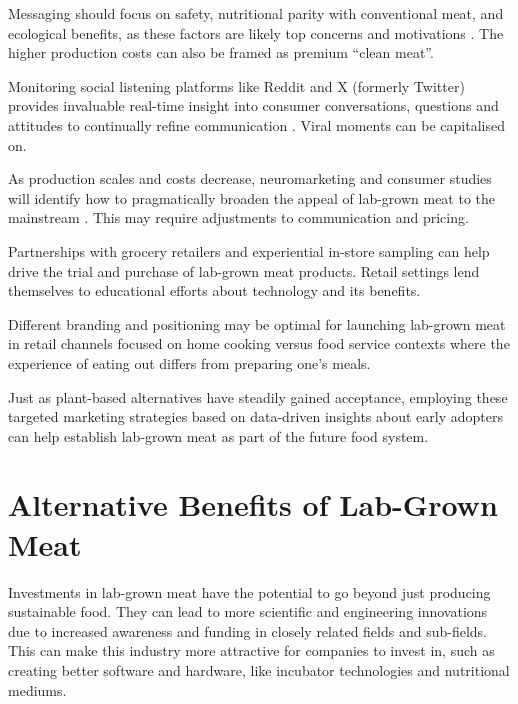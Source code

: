 \documentclass[10pt]{article}
\begin{document}
\begin{sloppypar}
  Messaging should focus on safety, nutritional parity with conventional meat, and ecological benefits, as these factors are likely top concerns and motivations \citep{circus_exploring_2018}. The higher production costs can also be framed as premium “clean meat”.

  Monitoring social listening platforms like Reddit and X (formerly Twitter) provides invaluable real-time insight into consumer conversations, questions and attitudes to continually refine communication \citep{verbeke_would_2015}. Viral moments can be capitalised on.

  As production scales and costs decrease, neuromarketing and consumer studies will identify how to pragmatically broaden the appeal of lab-grown meat to the mainstream \citep{verbeke_would_2015}. This may require adjustments to communication and pricing.

  Partnerships with grocery retailers and experiential in-store sampling can help drive the trial and purchase of lab-grown meat products. Retail settings lend themselves to educational efforts about technology and its benefits.


  Different branding and positioning may be optimal for launching lab-grown meat in retail channels focused on home cooking versus food service contexts where the experience of eating out differs from preparing one’s meals.

  Just as plant-based alternatives have steadily gained acceptance, employing these targeted marketing strategies based on data-driven insights about early adopters can help establish lab-grown meat as part of the future food system.

  \section{Alternative Benefits of Lab-Grown Meat}
  \label{sec:alternative-benefits}

  Investments in lab-grown meat have the potential to go beyond just producing sustainable food. They can lead to more scientific and engineering innovations due to increased awareness and funding in closely related fields and sub-fields. This can make this industry more attractive for companies to invest in, such as creating better software and hardware, like incubator technologies and nutritional mediums.



\end{sloppypar}
\end{document}
